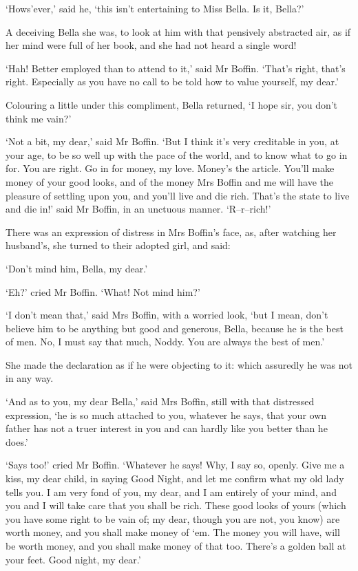 ‘Hows’ever,’ said he, ‘this isn’t entertaining to Miss Bella. Is it,
Bella?’

A deceiving Bella she was, to look at him with that pensively abstracted
air, as if her mind were full of her book, and she had not heard a
single word!

‘Hah! Better employed than to attend to it,’ said Mr Boffin. ‘That’s
right, that’s right. Especially as you have no call to be told how to
value yourself, my dear.’

Colouring a little under this compliment, Bella returned, ‘I hope sir,
you don’t think me vain?’

‘Not a bit, my dear,’ said Mr Boffin. ‘But I think it’s very creditable
in you, at your age, to be so well up with the pace of the world, and to
know what to go in for. You are right. Go in for money, my love. Money’s
the article. You’ll make money of your good looks, and of the money Mrs
Boffin and me will have the pleasure of settling upon you, and you’ll
live and die rich. That’s the state to live and die in!’ said Mr Boffin,
in an unctuous manner. ‘R--r--rich!’

There was an expression of distress in Mrs Boffin’s face, as, after
watching her husband’s, she turned to their adopted girl, and said:

‘Don’t mind him, Bella, my dear.’

‘Eh?’ cried Mr Boffin. ‘What! Not mind him?’

‘I don’t mean that,’ said Mrs Boffin, with a worried look, ‘but I mean,
don’t believe him to be anything but good and generous, Bella, because
he is the best of men. No, I must say that much, Noddy. You are always
the best of men.’

She made the declaration as if he were objecting to it: which assuredly
he was not in any way.

‘And as to you, my dear Bella,’ said Mrs Boffin, still with that
distressed expression, ‘he is so much attached to you, whatever he says,
that your own father has not a truer interest in you and can hardly like
you better than he does.’

‘Says too!’ cried Mr Boffin. ‘Whatever he says! Why, I say so, openly.
Give me a kiss, my dear child, in saying Good Night, and let me confirm
what my old lady tells you. I am very fond of you, my dear, and I am
entirely of your mind, and you and I will take care that you shall be
rich. These good looks of yours (which you have some right to be vain
of; my dear, though you are not, you know) are worth money, and you
shall make money of ‘em. The money you will have, will be worth money,
and you shall make money of that too. There’s a golden ball at your
feet. Good night, my dear.’

